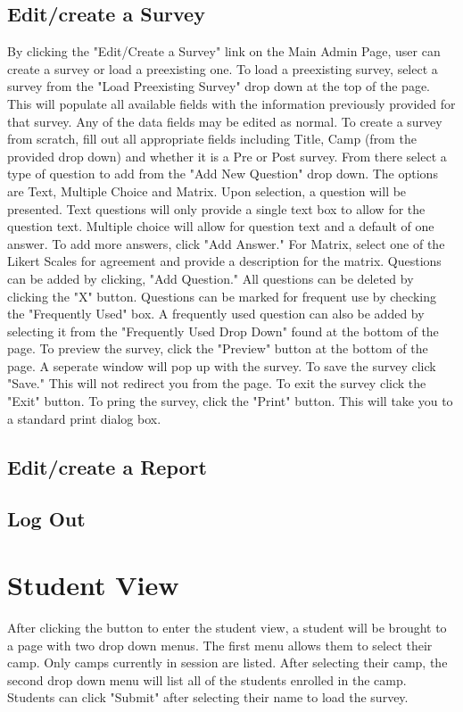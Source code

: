 \documentclass[letterpaper,10pt,serif, draftclsnofoot,onecolumn, compsoc, titlepage]{IEEEtran}
\begin{document}
\subsection{Edit/create a Survey}
By clicking the "Edit/Create a Survey" link on the Main Admin Page, user can create a survey or 
load a preexisting one. To load a preexisting survey, select a survey from the "Load Preexisting Survey"
 drop down at the top of the page. This will populate all available fields with the information 
 previously provided for that survey. Any of the data fields may be edited as normal. 
 To create a survey from scratch, fill out all appropriate fields including Title, Camp (from the provided 
 drop down) and whether it is a Pre or Post survey. From there select a type of question to add from the 
 "Add New Question" drop down. The options are Text, Multiple Choice and Matrix. Upon selection, a question will 
 be presented. Text questions will only provide a single text box to allow for the question text. 
 Multiple choice will allow for question text and a default of one answer. To add more answers, click "Add Answer."
 For Matrix, select one of the Likert Scales for agreement and provide a description for the matrix. Questions can 
 be added by clicking, "Add Question." All questions can be deleted by clicking the "X" button. Questions can be marked 
 for frequent use by checking the "Frequently Used" box. 
 A frequently used question can also be added by selecting it from the "Frequently Used Drop Down" 
 found at the bottom of the page. To preview the survey, click the "Preview" button at the bottom of the page. 
 A seperate window will pop up with the survey. To save the survey click "Save." This will not redirect you from 
 the page. To exit the survey click the "Exit" button. To pring the survey, click the "Print" button. This will take 
 you to a standard print dialog box. 
\subsection{Edit/create a Report}
\subsection{Log Out}

\section{Student View}
After clicking the button to enter the student view, a student will be brought to a page with two drop down menus.
The first menu allows them to select their camp.
Only camps currently in session are listed.
After selecting their camp, the second drop down menu will list all of the students enrolled in the camp.
Students can click "Submit" after selecting their name to load the survey.
\end{document}
